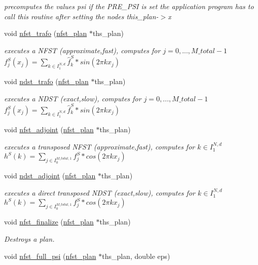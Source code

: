 \begin{CompactItemize}
\begin{CompactList}\small\item\em precomputes the values psi if the PRE\_\-PSI is set the application program has to call this routine after setting the nodes this\_\-plan-$>$x \item\end{CompactList}\item 
void \hyperlink{group__nfsct_gc80b86521428ec2191919cc96c82f416}{nfst\_\-trafo} (\hyperlink{structnfst__plan}{nfst\_\-plan} $\ast$ths\_\-plan)
\begin{CompactList}\small\item\em executes a NFST (approximate,fast), computes for $j=0,...,M\_total-1$ $f_j^S(x_j) = \sum_{k \in I_1^{N,d}} \hat{f}_k^S * sin(2 \pi k x_j)$ \item\end{CompactList}\item 
void \hyperlink{group__nfsct_g5ef7b3146d464de1d0f41de100f63bc6}{ndst\_\-trafo} (\hyperlink{structnfst__plan}{nfst\_\-plan} $\ast$ths\_\-plan)
\begin{CompactList}\small\item\em executes a NDST (exact,slow), computes for $j=0,...,M\_total-1$ $f_j^S(x_j) = \sum_{k \in I_1^{N,d}} \hat{f}_k^S * sin(2 \pi k x_j)$ \item\end{CompactList}\item 
void \hyperlink{group__nfsct_g0ae3871b80dda28e7aabe541a48d34e2}{nfst\_\-adjoint} (\hyperlink{structnfst__plan}{nfst\_\-plan} $\ast$ths\_\-plan)
\begin{CompactList}\small\item\em executes a transposed NFST (approximate,fast), computes for $k \in I_1^{N,d}$ $h^S(k) = \sum_{j \in I_0^{M\_total,1}} f_j^S * cos(2 \pi k x_j)$ \item\end{CompactList}\item 
void \hyperlink{group__nfsct_g684ed95d0a523eed202573fb928a3725}{ndst\_\-adjoint} (\hyperlink{structnfst__plan}{nfst\_\-plan} $\ast$ths\_\-plan)
\begin{CompactList}\small\item\em executes a direct transposed NDST (exact,slow), computes for $k \in I_1^{N,d}$ $h^S(k) = \sum_{j \in I_0^{M\_total,1}} f_j^S * cos(2 \pi k x_j)$ \item\end{CompactList}\item 
void \hyperlink{group__nfsct_gb5d03eeff969c872061d96998f9f0405}{nfst\_\-finalize} (\hyperlink{structnfst__plan}{nfst\_\-plan} $\ast$ths\_\-plan)
\begin{CompactList}\small\item\em Destroys a plan. \item\end{CompactList}\item 
\hypertarget{group__nfsct_g02d072e80ccaca6482b396540eaef585}{
void \hyperlink{group__nfsct_g02d072e80ccaca6482b396540eaef585}{nfst\_\-full\_\-psi} (\hyperlink{structnfst__plan}{nfst\_\-plan} $\ast$ths\_\-plan, double eps)}
\label{group__nfsct_g02d072e80ccaca6482b396540eaef585}


\end{CompactItemize}
